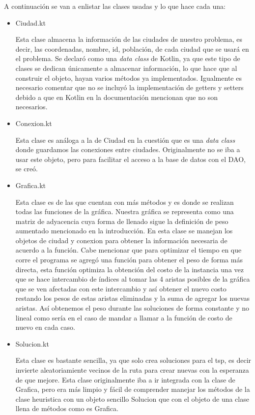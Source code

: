 \documentclass{article}
\begin{document}
A continuación se van a enlistar las clases usadas y lo que hace cada una:
\begin{itemize}
	\item {Ciudad.kt
		
		Esta clase almacena la información de las ciudades de nuestro problema, es decir, las coordenadas, nombre, id, población, de cada ciudad que se usará en el problema. Se declaró como una \emph{data class} de Kotlin, ya que este tipo de clases se dedican únicamente a almacenar información, lo que hace que al construir el objeto, hayan varios métodos ya implementados. Igualmente es necesario comentar que no se incluyó la implementación de getters y setters debido a que en Kotlin en la documentación mencionan que no son necesarios.
	}
	\item {Conexion.kt
		
		Esta clase es análoga a la de Ciudad en la cuestión que es una \emph{data class} donde guardamos las conexiones entre ciudades. Originalmente no se iba a usar este objeto, pero para facilitar el acceso a la base de datos con el DAO, se creó.
	}
	\item {Grafica.kt
		
		Esta clase es de las que cuentan con más métodos y es donde se realizan todas las funciones de la gráfica. Nuestra gráfica se representa como una matriz de adyacencia cuya forma de llenado sigue la definición de peso aumentado mencionado en la introducción. En esta clase se manejan los objetos de ciudad y conexion para obtener la información necesaria de acuerdo a la función. Cabe mencionar que para optimizar el tiempo en que corre el programa se agregó una función para obtener el peso de forma más directa, esta función optimiza la obtención del costo de la instancia una vez que se hace intercambio de índices al tomar las 4 aristas posibles de la gráfica que se ven afectadas con este intercambio y así obtener el nuevo costo restando los pesos de estas aristas eliminadas y la suma de agregar los nuevas aristas. Así obtenemos el peso durante las soluciones de forma constante y no lineal como sería en el caso de mandar a llamar a la función de costo de nuevo en cada caso.
	}
	\item {Solucion.kt
		
		Esta clase es bastante sencilla, ya que solo crea soluciones para el tsp, es decir invierte aleatoriamiente vecinos de la ruta para crear nuevas con la esperanza de que mejore. Esta clase originalmente iba a ir integrada con la clase de Grafica, pero era más limpio y fácil de comprender manejar los métodos de la clase heuristica con un objeto sencillo Solucion que con el objeto de una clase llena de métodos como es Grafica.
	
}
\end{itemize}
\end{document}
